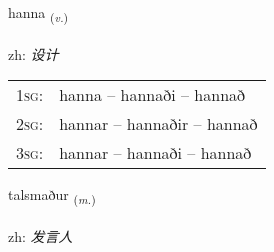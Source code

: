 \documentclass[frontgrid, backgrid]{flacards}\usepackage[]{graphicx}\usepackage[]{color}
\begin{document}
\renewcommand{\flhead}{\vskip5pt \fboxsep=0pt {\small\bfseries\footnotesize Sagnorð | 动词}}
\renewcommand{\fcfoot}{\vskip5pt \fboxsep=0pt \hspace{2pt}{\small\bfseries\footnotesize 2K}}

\renewcommand{\blhead}{\vskip5pt {\small\bfseries\footnotesize Sagnorð | 动词 }}
\renewcommand{\bcfoot}{\vskip5pt \hspace{2pt}{\small\bfseries\footnotesize 2K}}


{hanna \small{\textsubscript{(\textit{v.})}} \\[1ex] %
\textphonetic{[hana]} \\
zh: \emph{设计} \\  [2ex]
\renewcommand*{\arraystretch}{0.8}
\begin{tabular}{p{1cm}l}
\textsc{1sg}: & hanna -- hannaði -- hannað \\ 
\textsc{2sg}: & hannar -- hannaðir -- hannað \\ 
\textsc{3sg}: & hannar -- hannaði -- hannað \\ 
\end{tabular}
}

\renewcommand{\flhead}{\vskip5pt \fboxsep=0pt {\small\bfseries\footnotesize Nafnorð | 名词}}
\renewcommand{\fcfoot}{\vskip5pt \fboxsep=0pt \hspace{2pt}{\small\bfseries\footnotesize 2K}}

\renewcommand{\blhead}{\vskip5pt {\small\bfseries\footnotesize Nafnorð | 名词 }}
\renewcommand{\bcfoot}{\vskip5pt \hspace{2pt}{\small\bfseries\footnotesize 2K}}


{talsmaður \small{\textsubscript{(\textit{m.})}} \\[1ex] %
\textphonetic{[tʰalsmaðʏr]} \\
zh: \emph{发言人} \\  [2ex]
\renewcommand*{\arraystretch}{0.8}
}
\end{document}
